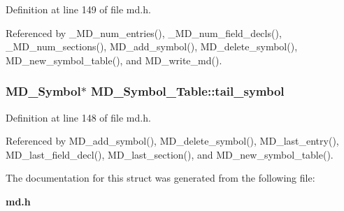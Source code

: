 Definition at line 149 of file md.h.

Referenced by \_\-MD\_\-num\_\-entries(), \_\-MD\_\-num\_\-field\_\-decls(), \_\-MD\_\-num\_\-sections(), MD\_\-add\_\-symbol(), MD\_\-delete\_\-symbol(), MD\_\-new\_\-symbol\_\-table(), and MD\_\-write\_\-md().
\subsubsection{\setlength{\rightskip}{0pt plus 5cm}\bf{MD\_\-Symbol}$\ast$ \bf{MD\_\-Symbol\_\-Table::tail\_\-symbol}}\label{structMD__Symbol__Table_f0e4f75f6a065bdf849b3f185a08b185}




Definition at line 148 of file md.h.

Referenced by MD\_\-add\_\-symbol(), MD\_\-delete\_\-symbol(), MD\_\-last\_\-entry(), MD\_\-last\_\-field\_\-decl(), MD\_\-last\_\-section(), and MD\_\-new\_\-symbol\_\-table().

The documentation for this struct was generated from the following file:\begin{CompactItemize}
\item 
\bf{md.h}\end{CompactItemize}
